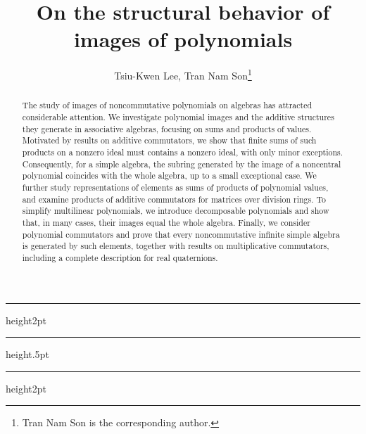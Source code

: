 \documentclass[11pt]{article}
\title{\Large On the structural behavior of images of polynomials}
\author{Tsiu-Kwen Lee, Tran Nam Son\footnote{Tran Nam Son is the corresponding author.}}
\makeatletter
\theoremstyle{definition}
\renewcommand\maketitle{
	\begin{center}
		\hrule height2pt
		\vskip10pt
		{\LARGE\bfseries \@title \par}
		\vskip10pt
		\hrule height.5pt
		\vskip5pt
		{\large\bfseries \@author \par}
		\vskip3pt
		\hrule height2pt
	\end{center}
	\vskip6pt
}
\makeatother
\begin{document}
	
	\maketitle
	
	\begin{abstract}
		\footnotesize

 The study of images of noncommutative polynomials on algebras has attracted considerable attention. We investigate polynomial images and the additive structures they generate in associative algebras, focusing on sums and products of values. Motivated by results on additive commutators, we show that finite sums of such products on a nonzero ideal must contains a nonzero ideal, with only minor exceptions. Consequently, for a simple algebra, the subring generated by the image of a noncentral polynomial coincides with the whole algebra, up to a small exceptional case. We further study representations of elements as sums of products of polynomial values, and examine products of additive commutators for matrices over division rings. To simplify multilinear polynomials, we introduce decomposable polynomials and show that, in many cases, their images equal the whole algebra. Finally, we consider polynomial commutators and prove that every noncommutative infinite simple algebra is generated by such elements, together with results on multiplicative commutators, including a complete description for real quaternions.
	\end{abstract}
	
	
\end{document}
